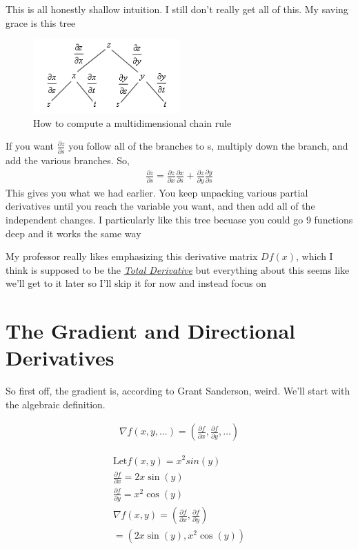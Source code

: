 \documentclass[12pt, letterpaper]{article}
\newcommand{\externalLink}[2]{\emph{\underline{\href{#1}{#2}}}}
\begin{document}
This is all honestly shallow intuition. I still don't really get all of this. My saving grace is this tree
\begin{figure}[h]
    \centering 
    \includegraphics[width=0.5\textwidth]{chainruletree}
    \caption{How to compute a multidimensional chain rule}
\end{figure}

If you want \large$\frac{\partial z}{\partial s}$ \normalsize you follow all of the branches to s, multiply down the branch, and add the various branches. So,
\begin{gather*}
    \frac{\partial z}{\partial s} = \frac{\partial z}{\partial x} \frac{\partial x}{\partial s} + \frac{\partial z}{\partial y} \frac{\partial y}{\partial s}
\end{gather*}
This gives you what we had earlier. You keep unpacking various partial derivatives until you reach the variable you want, and then add all of the independent changes. I particularly like this tree becuase you could go 9 functions deep and it works the same way

My professor really likes emphasizing this derivative matrix $Df(x)$, which I think is supposed to be the \externalLink{https://en.wikipedia.org/wiki/Total_derivative}{Total Derivative} but everything about this seems like we'll get to it later so I'll skip it for now and instead focus on

\section{The Gradient and Directional Derivatives}
So first off, the gradient is, according to Grant Sanderson, weird. We'll start with the algebraic definition.

\begin{gather*}
    \nabla f(x, y, ...) = (\frac{\partial f}{\partial x}, \frac{\partial f}{\partial y}, \dots)
\end{gather*}

\begin{gather*}
    \text{Let} f(x, y) = x^2 sin(y)\\
    \frac{\partial f}{\partial x} = 2x\sin(y) \\
    \frac{\partial f}{\partial y} = x^2\cos(y) \\
    \nabla f(x, y) = (\frac{\partial f}{\partial x}, \frac{\partial f}{\partial y}) \\
    = (2x\sin(y), x^2\cos(y))
\end{gather*}
\end{document}
